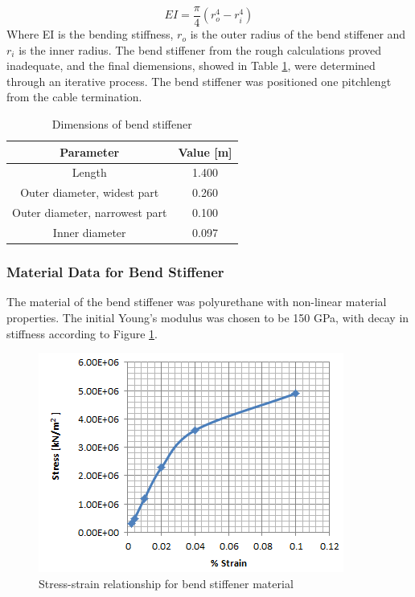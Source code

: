  \begin{equation}
  EI = \frac{\pi}{4}(r_o^4 - r_i^4) 
\end{equation}
 Where EI is the bending stiffness, $r_o$ is the outer radius of the bend stiffener and $r_i$ is the inner radius.\newline 
\newline 
The bend stiffener from the rough calculations proved inadequate, and the final diemensions, showed in Table \ref{table:benddim},  were determined through an iterative process. The bend stiffener was positioned one pitchlengt from the cable termination.
 \begin{table} [H]
\centering
\begin{tabular}{ |c|c|}
\hline
Parameter & Value [m] \\
 \hline
 \hline
 
 Length & 1.400 \\
 
Outer diameter, widest part & 0.260\\

Outer diameter, narrowest part & 0.100\\

 Inner diameter & 0.097 \\
 

 \hline
\end{tabular}
\caption{Dimensions of bend stiffener}
\label{table:benddim}
\end{table}
\subsubsection{Material Data for Bend Stiffener}
The material of the bend stiffener was polyurethane with non-linear material properties. The initial Young's modulus was chosen to be 150 GPa, with decay in stiffness according to  Figure \ref{fig:matbend}.
\begin{figure}[H]
\centering
\includegraphics[scale=0.8]{figures/matbend}
\caption[$\; \:$Stress-strain relationship for bend stiffener material]{Stress-strain relationship for bend stiffener material}
 \label{fig:matbend}
\end{figure}

